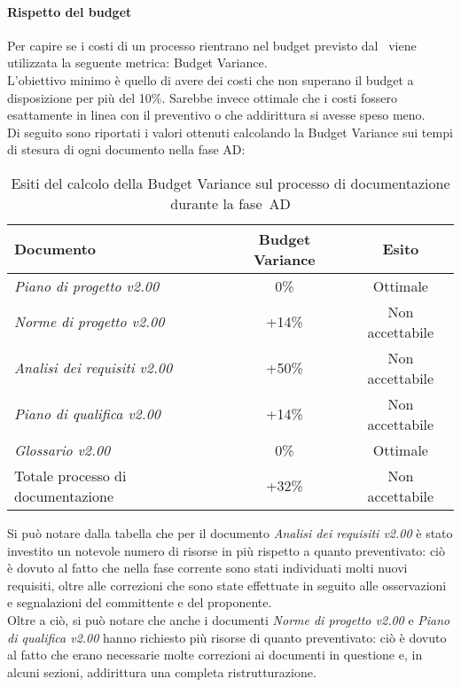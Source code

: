 \documentclass[../PianoDiQualifica.tex]{subfiles}
\begin{document}
\begin{appendices}
			\paragraph{Rispetto del budget}
			Per capire se i costi di un processo rientrano nel budget previsto dal \pianodiprogetto\ viene utilizzata la seguente metrica: Budget Variance.\\
			L'obiettivo minimo è quello di avere dei costi che non superano il budget a disposizione per più del 10\%. Sarebbe invece ottimale che i costi fossero esattamente in linea con il preventivo o che addirittura si avesse speso meno.\\
			Di seguito sono riportati i valori ottenuti calcolando la Budget Variance sui tempi di stesura di ogni documento nella fase AD:
			\begin{table}[H]
				\centering
				\begin{tabular}{l * {2}{c}}
					\toprule
					\textbf{Documento} & \textbf{Budget Variance} & \textbf{Esito} \\
					\midrule
					\textit{Piano di progetto v2.00} & 0\% &  Ottimale \\
					\textit{Norme di progetto v2.00} & +14\% & Non accettabile \\
					\textit{Analisi dei requisiti v2.00} & +50\% & Non accettabile \\
					\textit{Piano di qualifica v2.00} & +14\% & Non accettabile \\
					\textit{Glossario v2.00} & 0\% & Ottimale \\
					Totale processo di documentazione & +32\% & Non accettabile \\
					\bottomrule
				\end{tabular}
				\caption{Esiti del calcolo della Budget Variance sul processo di documentazione durante la fase\g\ AD}
				\label{tab:esiti_budget_variance}
			\end{table}
			Si può notare dalla tabella che per il documento \textit{Analisi dei requisiti v2.00} è stato investito un notevole numero di risorse in più rispetto a quanto preventivato: ciò è dovuto al fatto che nella fase corrente sono stati individuati molti nuovi requisiti, oltre alle correzioni che sono state effettuate in seguito alle osservazioni e segnalazioni del committente e del proponente.\\
			Oltre a ciò, si può notare che anche i documenti \textit{Norme di progetto v2.00} e \textit{Piano di qualifica v2.00} hanno richiesto più risorse di quanto preventivato: ciò è dovuto al fatto che erano necessarie molte correzioni ai documenti in questione e, in alcuni sezioni, addirittura una completa ristrutturazione. 
						

\end{appendices}
\end{document}
